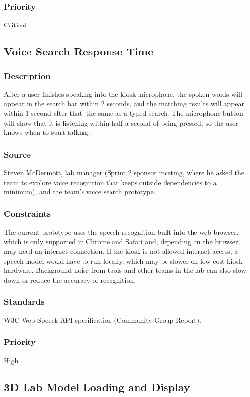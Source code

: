 \subsubsection{Priority}
Critical

\subsection{Voice Search Response Time}
\subsubsection{Description}
After a user finishes speaking into the kiosk microphone, the spoken words will appear in the search bar within 2 seconds, and the matching results will appear within 1 second after that, the same as a typed search. The microphone button will show that it is listening within half a second of being pressed, so the user knows when to start talking.
\subsubsection{Source}
Steven McDermott, lab manager (Sprint 2 sponsor meeting, where he asked the team to explore voice recognition that keeps outside dependencies to a minimum), and the team's voice search prototype.
\subsubsection{Constraints}
The current prototype uses the speech recognition built into the web browser, which is only supported in Chrome and Safari and, depending on the browser, may need an internet connection. If the kiosk is not allowed internet access, a speech model would have to run locally, which may be slower on low cost kiosk hardware. Background noise from tools and other teams in the lab can also slow down or reduce the accuracy of recognition.
\subsubsection{Standards}
W3C Web Speech API specification (Community Group Report).
\subsubsection{Priority}
High

\subsection{3D Lab Model Loading and Display}
